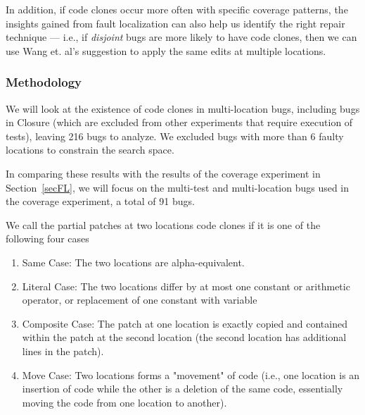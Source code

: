 \documentclass[sigconf, timestamp-false, anonymous=true]{acmart}
\begin{document}
In addition, if code clones occur more often with specific coverage patterns, the insights gained from 
fault 
localization can also help us identify the right repair technique --- i.e., if \emph{disjoint} bugs are more 
likely to have code clones, then we can use Wang et. al's suggestion to apply the same edits at multiple 
locations.


\subsubsection{Methodology}
\label{sec52}
We will look at the existence of code clones in multi-location bugs, including bugs in Closure (which are 
excluded from other experiments that require execution of tests), leaving 216 bugs to analyze. We 
excluded bugs with more than 6 faulty locations to constrain the search space.

In comparing these results with the results of the coverage experiment in
Section~\ref{secFL}, we will focus on the multi-test and multi-location bugs used in the coverage 
experiment, a total of 91 bugs.

We call the partial patches at two locations code clones if it is one of the following four cases
\begin{enumerate}
	\item Same Case: The two locations are alpha-equivalent. 
	\item Literal Case: The two locations differ by at most one constant or arithmetic operator,
	or replacement of one constant with variable 
	\item Composite Case: The patch at one location is exactly copied and contained within the patch at 
	the 
	second location (the second location  has additional lines in the patch).
	\item Move Case: Two locations forms a "movement" of code (i.e., one location is an insertion of 
	code 
	while the other is a deletion of the same code, essentially moving the code from one location to 
	another).
\end{enumerate}
\end{document}
